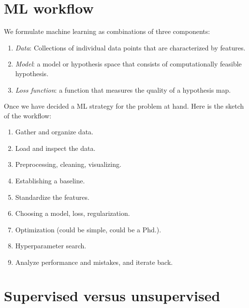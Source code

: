 \documentclass[a4paper, 12pt]{book}
\begin{document}
\section{ML workflow}

We formulate machine learning as combinations of three components:
\begin{enumerate}
    \item \emph{Data}: Collections of individual data points that are characterized by features.
    \item \emph{Model}: a model or hypothesis space that consists of computationally feasible hypothesis.
    \item \emph{Loss function}: a function that measures the quality of a hypothesis map.
\end{enumerate}


Once we have decided a ML strategy for the problem at hand. Here is the sketch of the workflow:
\begin{enumerate}
    \item Gather and organize data.
    \item Load and inspect the data.
    \item Preprocessing, cleaning, visualizing.
    \item Establishing a baseline.
    \item Standardize the features.
    \item Choosing a model, loss, regularization.
    \item Optimization (could be simple, could be a Phd.).
    \item Hyperparameter search.
    \item Analyze performance and mistakes, and iterate back.
\end{enumerate}

\section{Supervised versus unsupervised}
\end{document}
